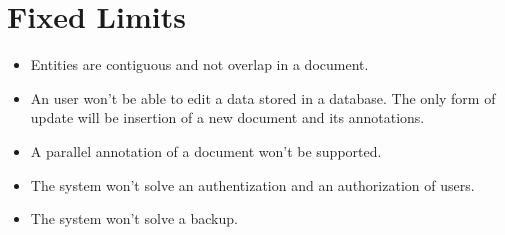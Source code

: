 \section{Fixed Limits} 
\begin{itemize}
	\item Entities are contiguous and not overlap in a document.
	\item An user won't be able to edit a data stored in a database. The only form
	of update will be insertion of a new document and its annotations.
	\item A parallel annotation of a document won't be supported.
	\item The system won't solve an authentization and  an authorization of users.
	\item The system won't solve a backup.
\end{itemize}


